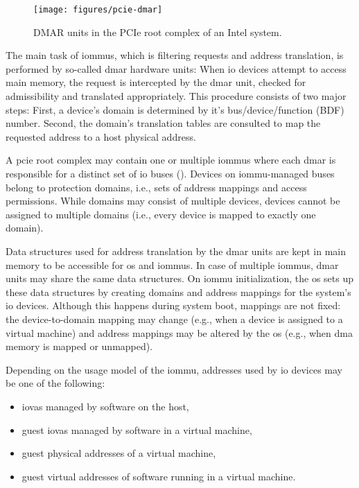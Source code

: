 \begin{figure}
    \centering
    \texttt{[image: figures/pcie-dmar]}
    \caption{DMAR units in the PCIe root complex of an Intel system.}
    \label{fig:pcie-dmar}
\end{figure}

The main task of \acp{iommu}, which is filtering requests and address
translation, is performed by so-called \ac{dmar} hardware units: When \ac{io}
devices attempt to access main memory, the request is intercepted by the
\ac{dmar} unit, checked for admissibility and translated appropriately. This
procedure consists of two major steps: First, a device's domain is determined by
it's bus/device/function (BDF) number. Second, the domain's translation tables
are consulted to map the requested address to a host physical address.

A \ac{pcie} root complex may contain one or multiple \acp{iommu} where each
\ac{dmar} is responsible for a distinct set of \ac{io} buses
(). Devices on \ac{iommu}-managed buses belong to protection
domains, i.e., sets of address mappings and access permissions. While domains
may consist of multiple devices, devices cannot be assigned to multiple domains
(i.e., every device is mapped to exactly one domain).

Data structures used for address translation by the \ac{dmar} units are kept in
main memory to be accessible for \ac{os} and \acp{iommu}. In case of multiple
\acp{iommu}, \ac{dmar} units may share the same data structures. On \ac{iommu}
initialization, the \ac{os} sets up these data structures by creating domains
and address mappings for the system's \ac{io} devices. Although this happens
during system boot, mappings are not fixed: the device-to-domain mapping may
change (e.g., when a device is assigned to a virtual machine) and address
mappings may be altered by the \ac{os} (e.g., when \ac{dma} memory is mapped or
unmapped).

Depending on the usage model of the \ac{iommu}, addresses used by \ac{io}
devices may be one of the following:

\begin{itemize}
    \item \acp{iova} managed by software on the host,
    \item guest \acp{iova} managed by software in a virtual machine,
    \item guest physical addresses of a virtual machine,
    \item guest virtual addresses of software running in a virtual machine.
\end{itemize}

